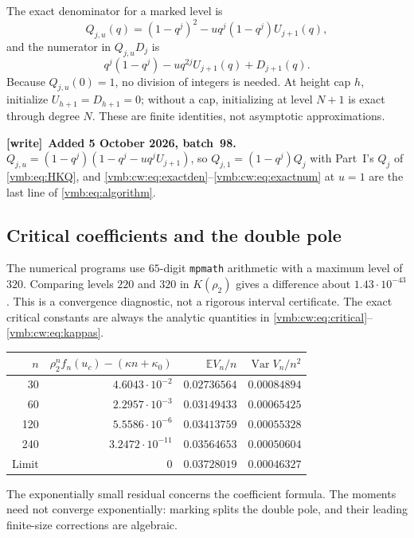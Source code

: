 \documentclass[11pt,a4paper]{article}
\numberwithin{equation}{section}
\theoremstyle{definition}\newtheorem{definition}[theorem]{Definition}
\theoremstyle{remark}\newtheorem{remark}[theorem]{Remark}
\newcommand{\E}{\mathbb E}
\newcommand{\Var}{\operatorname{Var}}
\newenvironment{writenote}[1][]{\par\smallskip\begingroup\small
 \noindent\textbf{[write]}\if\relax\detokenize{#1}\relax\else~\textbf{#1.}\fi\ }%
 {\par\endgroup\smallskip}
\begin{document}
The exact denominator for a marked level is
\begin{equation}\label{vmb:cw:eq:exactden}
 Q_{j,u}(q)=(1-q^j)^2-u q^j(1-q^j)U_{j+1}(q),
\end{equation}
and the numerator in $Q_{j,u}D_j$ is
\begin{equation}\label{vmb:cw:eq:exactnum}
 q^j(1-q^j)-u q^{2j}U_{j+1}(q)+D_{j+1}(q).
\end{equation}
Because $Q_{j,u}(0)=1$, no division of integers is needed. At height cap $h$,
initialize $U_{h+1}=D_{h+1}=0$; without a cap, initializing at level $N+1$
is exact through degree $N$. These are finite identities, not asymptotic
approximations.

\begin{writenote}[Added 5 October 2026, batch~98]
$Q_{j,u}=(1-q^j)(1-q^j-uq^jU_{j+1})$, so $Q_{j,1}=(1-q^j)Q_j$ with Part~I's
$Q_j$ of \eqref{vmb:eq:HKQ}, and \eqref{vmb:cw:eq:exactden}--\eqref{vmb:cw:eq:exactnum}
at $u=1$ are the last line of \eqref{vmb:eq:algorithm}.
\end{writenote}

\subsection{Critical coefficients and the double pole}
The numerical programs use $65$-digit \texttt{mpmath} arithmetic with a
maximum level of $320$. Comparing levels $220$ and $320$ in $K(\rho_2)$ gives
a difference about $1.43\cdot10^{-43}$. This is a convergence diagnostic,
not a rigorous interval certificate. The exact critical constants are
always the analytic quantities in \eqref{vmb:cw:eq:critical}--\eqref{vmb:cw:eq:kappas}.

\begin{center}
\begin{tabular}{@{}rrrr@{}}
\toprule
$n$ & $\rho_2^nf_n(u_c)-(\kappa n+\kappa_0)$ & $\E V_n/n$ & $\Var V_n/n^2$\\
\midrule
30  & $4.6043\cdot10^{-2}$ & $0.02736564$ & $0.00084894$\\
60  & $2.2957\cdot10^{-3}$ & $0.03149433$ & $0.00065425$\\
120 & $5.5586\cdot10^{-6}$ & $0.03413759$ & $0.00055328$\\
240 & $3.2472\cdot10^{-11}$& $0.03564653$ & $0.00050604$\\
\midrule
Limit & $0$ & $0.03728019$ & $0.00046327$\\
\bottomrule
\end{tabular}
\end{center}
The exponentially small residual concerns the coefficient formula. The
moments need not converge exponentially: marking splits the double pole,
and their leading finite-size corrections are algebraic.
\end{document}
